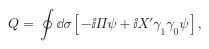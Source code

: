 \begin{equation}\label{toy-su}
  Q=\oint\dd \sigma[-\ii\Pi\psi+\ii X'\gamma_1\gamma_0\psi],
\end{equation}

